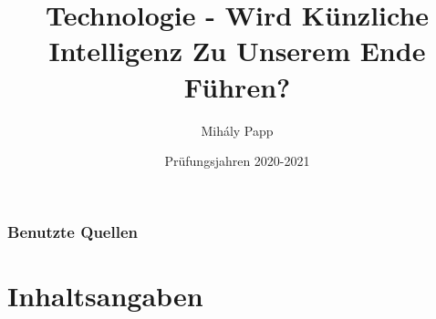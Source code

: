 \documentclass[12pt, a4paper, onecolumn, titlepage]{article}
\title{Technologie - Wird Künzliche Intelligenz Zu Unserem Ende Führen?}
\author{Mihály Papp \\
  \multicolumn{1}{p{.7\textwidth}}{\centering\emph{Friedrich-Schiller-Gymnasium und Schülerwohnheim, Klasse 12/5}}}
\date{Prüfungsjahren 2020-2021}
\begin{document}
\maketitle

\renewcommand{\cftpartleader}{\cftdotfill{\cftdotsep}}
\tableofcontents
\newpage


\newpage

\nocite{*}
\section{Benutzte Quellen}
\printbibliography[title={" "}, heading=subbibliography]
\newpage

\part{Inhaltsangaben}

\newpage
\end{document}
